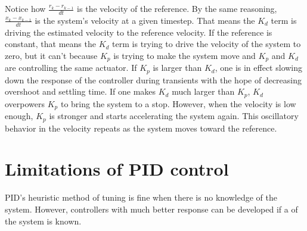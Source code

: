 Notice how $\frac{r_k - r_{k-1}}{dt}$ is the velocity of the reference. By the
same reasoning, $\frac{x_k - x_{k-1}}{dt}$ is the system's velocity at a given
timestep. That means the $K_d$ term is driving the estimated velocity to the
reference velocity. If the reference is constant, that means the $K_d$ term is
trying to drive the velocity of the system to zero, but it can't because $K_p$
is trying to make the system move and $K_p$ and $K_d$ are controlling the same
actuator. If $K_p$ is larger than $K_d$, one is in effect slowing down the
response of the controller during transients with the hope of decreasing
overshoot and settling time. If one makes $K_d$ much larger than $K_p$, $K_d$
overpowers $K_p$ to bring the system to a stop. However, when the velocity is
low enough, $K_p$ is stronger and starts accelerating the system again. This
oscillatory behavior in the velocity repeats as the system moves toward the
reference.

\section{Limitations of PID control}

PID's heuristic method of tuning is fine when there is no knowledge of the
\gls{system}. However, controllers with much better response can be developed if
a  of the \gls{system} is known.
